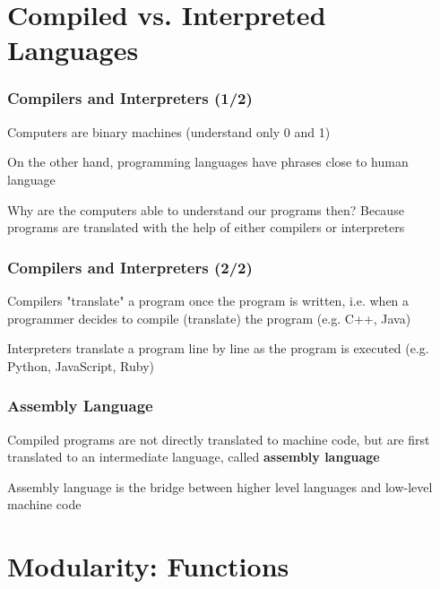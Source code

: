 \documentclass{beamer}
\begin{document}
\section{Compiled vs. Interpreted Languages}

\begin{frame}
\frametitle{Compilers and Interpreters (1/2)}
    Computers are binary machines (understand only 0 and 1)
    \newline

    On the other hand, programming languages have phrases close to human language
    \newline

    Why are the computers able to understand our programs then? Because programs are translated with the help of either compilers or interpreters
\end{frame}

\begin{frame}
\frametitle{Compilers and Interpreters (2/2)}
    Compilers "translate" a program once the program is written, i.e. when a programmer decides to compile (translate) the program (e.g. C++, Java)
    \newline

    Interpreters translate a program line by line as the program is executed (e.g. Python, JavaScript, Ruby)
\end{frame}

\begin{frame}
\frametitle{Assembly Language}
    Compiled programs are not directly translated to machine code, but are first translated to an intermediate language, called \textbf{assembly language}
    \newline

    Assembly language is the bridge between higher level languages and low-level machine code
\end{frame}

\section{Modularity: Functions}
\end{document}
